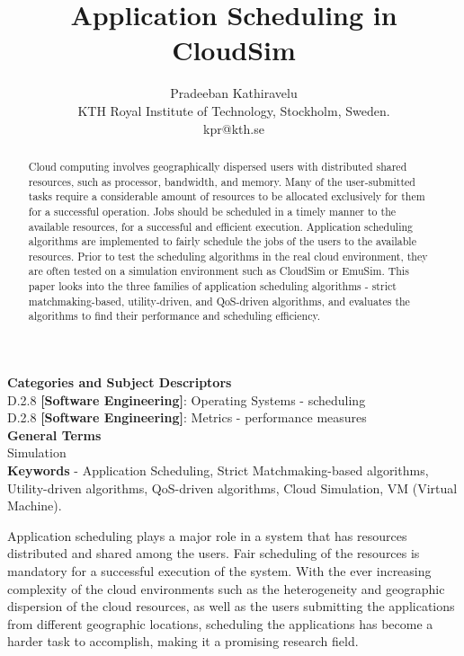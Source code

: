 \documentclass[times, 10pt,twocolumn]{article}
\begin{document}
\title{Application Scheduling in CloudSim}

\author{Pradeeban Kathiravelu\\
KTH Royal Institute of Technology, Stockholm, Sweden.\\ kpr@kth.se\\
}

\maketitle
\thispagestyle{empty}

\begin{abstract}
   Cloud computing involves geographically dispersed users with distributed shared resources, such as processor, bandwidth, and memory. Many of the user-submitted tasks require a considerable amount of resources to be allocated exclusively for them for a successful operation. Jobs should be scheduled in a timely manner to the available resources, for a successful and efficient execution. Application scheduling algorithms are implemented to fairly schedule the jobs of the users to the available resources. Prior to test the scheduling algorithms in the real cloud environment, they are often tested on a simulation environment such as CloudSim or EmuSim. This paper looks into the three families of application scheduling algorithms -  strict matchmaking-based, utility-driven, and QoS-driven algorithms, and evaluates the algorithms to find their performance and scheduling efficiency. 
\end{abstract}


\textbf{Categories and Subject Descriptors}\\
D.2.8 \textbf{[Software Engineering]}: Operating Systems - scheduling\\
D.2.8 \textbf{[Software Engineering]}: Metrics - performance measures\\
\textbf{General Terms}\\
Simulation\\
\textbf{Keywords} -  Application Scheduling, Strict Matchmaking-based algorithms, Utility-driven algorithms, QoS-driven algorithms, Cloud Simulation, VM (Virtual Machine).


Application scheduling plays a major role in a system that has resources distributed and shared among the users. Fair scheduling of the resources is mandatory for a successful execution of the system. With the ever increasing complexity of the cloud environments such as the heterogeneity and geographic dispersion of the cloud resources, as well as the users submitting the applications from different geographic locations, scheduling the applications has become a harder task to accomplish, making it a promising research field.
\end{document}
